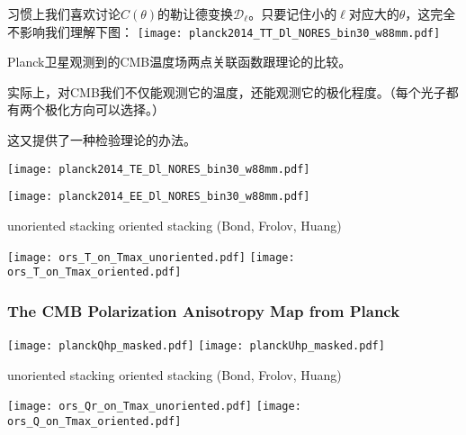 \documentclass[CJK]{beamer}
\begin{document}
\begin{frame}
\bch
习惯上我们喜欢讨论$C(\theta)$的勒让德变换$\mathcal{D}_\ell$。只要记住小的$\ell$对应大的$\theta$，这完全不影响我们理解下图：
  \texttt{[image: planck2014\_TT\_Dl\_NORES\_bin30\_w88mm.pdf]}

  Planck卫星观测到的CMB温度场两点关联函数跟理论的比较。
\ech
\end{frame}

\begin{frame}
\bch
实际上，对CMB我们不仅能观测它的温度，还能观测它的极化程度。（每个光子都有两个极化方向可以选择。）


这又提供了一种检验理论的办法。
\ech
\end{frame}

\begin{frame}
\end{frame}


\begin{frame}
  \texttt{[image: planck2014\_TE\_Dl\_NORES\_bin30\_w88mm.pdf]}
\end{frame}

\begin{frame}
  \texttt{[image: planck2014\_EE\_Dl\_NORES\_bin30\_w88mm.pdf]}
\end{frame}


\begin{frame}
  
  {\hskip 0.2in} {\scriptsize unoriented stacking}     {\hskip 0.65in} {\scriptsize oriented stacking (Bond, Frolov, Huang)}
            
  \texttt{[image: ors\_T\_on\_Tmax\_unoriented.pdf]}  
  \texttt{[image: ors\_T\_on\_Tmax\_oriented.pdf]}
\end{frame}

\begin{frame}
  \frametitle{The CMB Polarization Anisotropy Map from Planck}
  \texttt{[image: planckQhp\_masked.pdf]}
  \texttt{[image: planckUhp\_masked.pdf]}  

  {\hskip 0.2in} {\scriptsize unoriented stacking}     {\hskip 0.65in} {\scriptsize oriented stacking (Bond, Frolov, Huang)}
  
  \texttt{[image: ors\_Qr\_on\_Tmax\_unoriented.pdf]}
  \texttt{[image: ors\_Q\_on\_Tmax\_oriented.pdf]}  
  
\end{frame}
\end{document}
